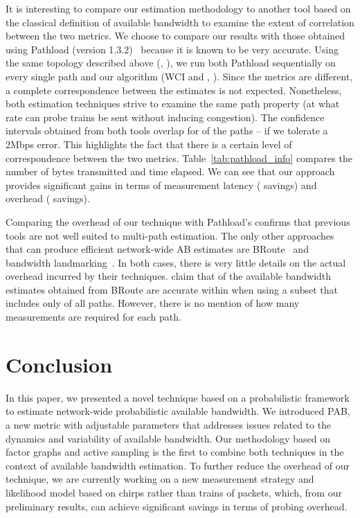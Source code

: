 \documentclass[final,5p,times,twocolumn]{elsarticle}
\begin{document}
It is interesting to compare our estimation methodology to another tool based on the classical definition of available bandwidth to examine the extent of correlation between the two metrics.  We choose to compare our results with those obtained using Pathload (version 1.3.2)~\cite{jai:03} because it is known to be very accurate.  Using the same topology described above (, ), we run both Pathload sequentially on every single path and our algorithm (WCI and , ).  Since the metrics are different, a complete correspondence between the estimates is not expected. Nonetheless, both estimation techniques strive to examine the same path property (at what rate can probe trains be sent without inducing congestion).  The confidence intervals obtained from both tools overlap for  of the paths --  if we tolerate a 2Mbps error.  This highlights the fact that there is a certain level of correspondence between the two metrics.  Table~\ref{tab:pathload_info} compares  the number of bytes transmitted and time elapsed.  We can see that our approach provides significant gains in terms of measurement latency ( savings) and overhead ( savings).  

Comparing the overhead of our technique with Pathload's confirms that previous tools are not well suited to multi-path estimation.  The only other approaches that can produce efficient network-wide AB estimates are BRoute~\cite{hu:05} and bandwidth landmarking~\cite{man:07bandwidth}.  In both cases, there is very little details on the actual overhead incurred by their techniques.  \citet{hu:05} claim that  of the available bandwidth estimates obtained from BRoute are accurate within  when using a subset that includes only  of all paths.  However, there is no mention of how many measurements are required for each path.

\section{Conclusion}
\label{sec:conclusion}

In this paper, we presented a novel technique based on a probabilistic framework to estimate network-wide probabilistic available bandwidth.  We introduced PAB, a new metric with adjustable parameters that addresses issues related to the dynamics and variability of available bandwidth.  Our methodology based on factor graphs and active sampling is the first to combine both techniques in the context of available bandwidth estimation.  To further reduce the overhead of our technique, we are currently working on a new measurement strategy and likelihood model based on chirps rather than trains of packets, which, from our preliminary results, can achieve significant savings in terms of probing overhead.



\end{document}
